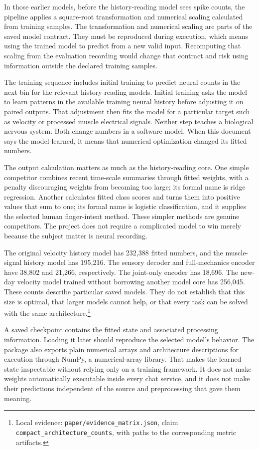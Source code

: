 In those earlier models, before the history-reading model sees spike counts, the pipeline applies a square-root transformation and numerical scaling calculated from training samples. The transformation and numerical scaling are parts of the saved model contract. They must be reproduced during execution, which means using the trained model to predict from a new valid input. Recomputing that scaling from the evaluation recording would change that contract and risk using information outside the declared training samples.

The training sequence includes initial training to predict neural counts in the next bin for the relevant history-reading models. Initial training asks the model to learn patterns in the available training neural history before adjusting it on paired outputs. That adjustment then fits the model for a particular target such as velocity or processed muscle electrical signals. Neither step teaches a biological nervous system. Both change numbers in a software model. When this document says the model learned, it means that numerical optimization changed its fitted numbers.

The output calculation matters as much as the history-reading core. One simple competitor combines recent time-scale summaries through fitted weights, with a penalty discouraging weights from becoming too large; its formal name is ridge regression. Another calculates fitted class scores and turns them into positive values that sum to one; its formal name is logistic classification, and it supplies the selected human finger-intent method. These simpler methods are genuine competitors. The project does not require a complicated model to win merely because the subject matter is neural recording.

The original velocity history model has 232,388 fitted numbers, and the muscle-signal history model has 195,216. The sensory decoder and full-mechanics encoder have 38,802 and 21,266, respectively. The joint-only encoder has 18,696. The new-day velocity model trained without borrowing another model core has 256,045. These counts describe particular saved models. They do not establish that this size is optimal, that larger models cannot help, or that every task can be solved with the same architecture.\footnote{Local evidence: \texttt{paper/evidence\_matrix.json}, claim \texttt{compact\_architecture\_counts}, with paths to the corresponding metric artifacts.}

A saved checkpoint contains the fitted state and associated processing information. Loading it later should reproduce the selected model's behavior. The package also exports plain numerical arrays and architecture descriptions for execution through NumPy, a numerical-array library. That makes the learned state inspectable without relying only on a training framework. It does not make weights automatically executable inside every chat service, and it does not make their predictions independent of the source and preprocessing that gave them meaning.

